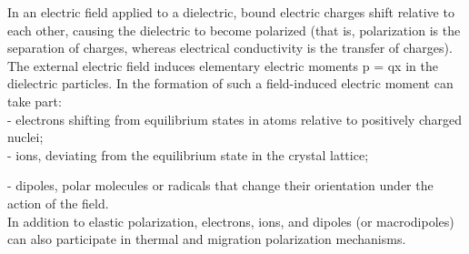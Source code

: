 \documentclass[a4paper,14pt]{extreport}
\begin{document}
In an electric field applied to a dielectric, bound electric charges shift relative to each other, causing the dielectric to become polarized (that is, polarization is the separation of charges, whereas electrical conductivity is the transfer of charges). The external electric field induces elementary electric moments p = qx in the dielectric particles.
In the formation of such a field-induced electric moment can take part: \\

- electrons shifting from equilibrium states in atoms relative to positively charged nuclei; \\

- ions, deviating from the equilibrium state in the crystal lattice; \

- dipoles, polar molecules or radicals that change their orientation under the action of the field. \\

In addition to elastic polarization, electrons, ions, and dipoles (or macrodipoles) can also participate in thermal and migration polarization mechanisms.
\end{document}
